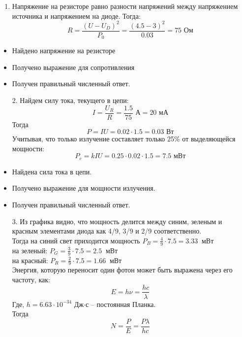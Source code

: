 \solutionSection


\begin{enumerate}
    \item Напряжение на резисторе равно разности напряжений между напряжением источника и напряжением на диоде. Тогда:
    $$R=\frac{(U-U_D)^2}{P_0}=\frac{(4.5-3)^2}{0.03}=75\text{ Ом}$$
    \end{enumerate}
    
    \markSection

    \begin{itemize}
    \item Найдено напряжение на резисторе
    \item Получено выражение для сопротивления
    \item Получен правильный численный ответ.
    \end{itemize}
    \begin{enumerate}
    \item [2.] Найдем силу тока, текущего в цепи:
    $$I=\frac{U_R}{R}=\frac{1.5}{75}\text{ А}=20\text{ мА}$$
    Тогда 
    $$P=IU=0.02\cdot1.5=0.03\text{ Вт}$$
    Учитывая, что только излучение составляет только 25\% от выделяющейся мощности:
    $$P_c=kIU=0.25\cdot0.02\cdot1.5=7.5\text{ мВт}$$
    \end{enumerate}
    
    \markSection

    \begin{itemize}
    \item Найдена сила тока в цепи.
    \item Получено выражение для мощности излучения.
    \item Получен правильный численный ответ.
    \end{itemize}
    \begin{enumerate}
    \item [3.] Из графика видно, что мощность делится между синим, зеленым и красным элементами диода как 4/9, 3/9 и 2/9 соответственно.\\ 
    Тогда на синий свет приходится мощность $P_B=\frac{4}{9}\cdot7.5=3.33 \: \text{ мВт}$\\
    на зеленый: $P_G=\frac{3}{9}\cdot7.5=2.5\:\text{ мВт}$\\
    на красный: $P_R=\frac{2}{9}\cdot7.5=1.66\:\text{ мВт}$\\
    Энергия, которую переносит один фотон может быть выражена через его частоту, как:
    $$E=h\nu=\frac{hc}{\lambda}$$
    Где, $h = 6.63\cdot10^{-34}$ Дж$\cdot$с – постоянная Планка.\\
    Тогда 
    $$N=\frac{P}{E}=\frac{P\lambda}{hc}$$
    \end{enumerate}
    
